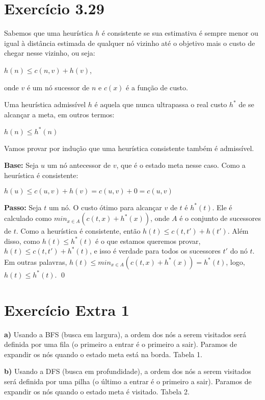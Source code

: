 \documentclass[12pt,letterpaper]{article}
\begin{document}
	\section*{Exercício 3.29}
	
	Sabemos que uma heurística $h$ é consistente se sua estimativa é sempre menor ou igual à distância estimada de qualquer nó vizinho até o objetivo mais o custo de chegar nesse vizinho, ou seja:
	\begin{center}
		$h(n) \leq c(n,v) + h(v)$,
	\end{center}  
	onde $v$ é um nó sucessor de $n$ e $c(x)$ é a função de custo.
	
	Uma heurística admissível $h$ é aquela que nunca ultrapassa o real custo $h^*$  de se alcançar a meta, em outros termos:
	\begin{center}
		$h(n) \leq h^*(n)$
	\end{center}
	
	Vamos provar por indução que uma heurística consistente também é admissível.
	
	\textbf{Base:} Seja $u$ um nó antecessor de $v$, que é o estado meta nesse caso. Como a heurística é consistente:
	\begin{center}
		$h(u)\leq c(u,v)+h(v)=c(u,v)+0=c(u,v)$
	\end{center}
	
	\textbf{Passo:} Seja $t$ um nó. O custo ótimo para alcançar $v$ de $t$ é $h^*(t)$.
	Ele é calculado como $min_{x\in A}(c(t, x)+h^*(x))$, onde $A$ é o conjunto de sucessores de $t$. Como a heurística é consistente, então $h(t)\leq c(t,t')+h(t')$. Além disso, como $h(t) \leq h^*(t)$ é o que estamos queremos provar, $h(t) \leq c(t, t') + h^*(t)$, e isso é verdade para todos os sucessores $t'$ do nó $t$. Em outras palavras, $h(t)\leq min_{x\in A}(c(t, x)+h^*(x))=h^*(t)$, logo, $h(t)\leq h^*(t)$. \qed
	
	\section*{Exercício Extra 1}
	\textbf{a)} Usando a BFS (busca em largura), a ordem dos nós a serem visitados será definida por uma fila (o primeiro a entrar é o primeiro a sair). Paramos de expandir os nós quando o estado meta está na borda. Tabela 1.
	
	\textbf{b)} Usando a DFS (busca em profundidade), a ordem dos nós a serem visitados será definida por uma pilha (o último a entrar é o primeiro a sair). Paramos de expandir os nós quando o estado meta é visitado. Tabela 2.
	
\end{document}
